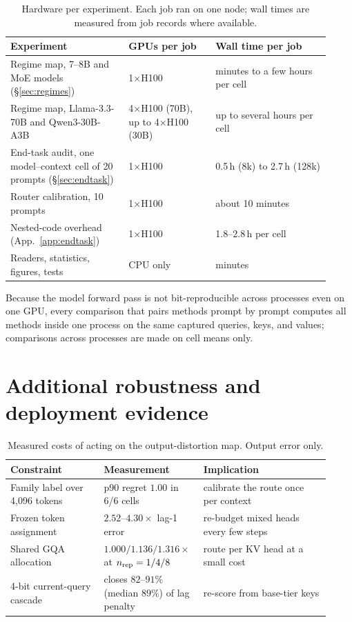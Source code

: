 \begin{table}[h]
\centering
\small
\setlength{\tabcolsep}{4pt}
\caption{Hardware per experiment.  Each job ran on one node; wall times are
measured from job records where available.}
\label{tab:app-compute}
\begin{tabular}{@{}p{0.34\linewidth}p{0.25\linewidth}p{0.33\linewidth}@{}}
\toprule
\textbf{Experiment} & \textbf{GPUs per job} & \textbf{Wall time per job} \\
\midrule
Regime map, 7--8B and MoE models (\S\ref{sec:regimes}) & 1$\times$H100 & minutes to a few hours per cell \\
Regime map, Llama-3.3-70B and Qwen3-30B-A3B & 4$\times$H100 (70B), up to 4$\times$H100 (30B) & up to several hours per cell \\
End-task audit, one model--context cell of 20 prompts (\S\ref{sec:endtask}) & 1$\times$H100 & 0.5\,h (8k) to 2.7\,h (128k) \\
Router calibration, 10 prompts & 1$\times$H100 & about 10 minutes \\
Nested-code overhead (App.~\ref{app:endtask}) & 1$\times$H100 & 1.8--2.8\,h per cell \\
Readers, statistics, figures, tests & CPU only & minutes \\
\bottomrule
\end{tabular}
\end{table}

Because the model forward pass is not bit-reproducible across processes even on
one GPU, every comparison that pairs methods prompt by prompt computes all
methods inside one process on the same captured queries, keys, and values;
comparisons across processes are made on cell means only.

\section{Additional robustness and deployment evidence}
\label{app:robustness}

\begin{table}[h]
\centering
\small
\setlength{\tabcolsep}{4pt}
\caption{Measured costs of acting on the output-distortion map. Output error only.}
\label{tab:deployment}
\begin{tabular}{@{}p{0.29\linewidth}p{0.25\linewidth}p{0.38\linewidth}@{}}
\toprule
\textbf{Constraint} & \textbf{Measurement} & \textbf{Implication} \\
\midrule
Family label over 4,096 tokens & p90 regret $1.00$ in 6/6 cells & calibrate the route once per context \\
Frozen token assignment & $2.52$--$4.30\times$ lag-1 error & re-budget mixed heads every few steps \\
Shared GQA allocation & $1.000/1.136/1.316\times$ at $n_{\rm rep}=1/4/8$ & route per KV head at a small cost \\
4-bit current-query cascade & closes $82$--$91\%$ (median $89\%$) of lag penalty & re-score from base-tier keys \\
\bottomrule
\end{tabular}
\end{table}


